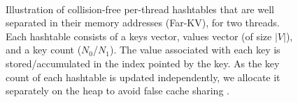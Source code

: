\begin{figure}[hbtp]
  \centering
   \\[-2ex]
  \caption{Illustration of collision-free per-thread hashtables that are well separated in their memory addresses (Far-KV), for two threads. Each hashtable consists of a keys vector, values vector (of size $|V|$), and a key count ($N_0$/$N_1$). The value associated with each key is stored/accumulated in the index pointed by the key. As the key count of each hashtable is updated independently, we allocate it separately on the heap to avoid false cache sharing \cite{sahu2023gvelouvain}.}
  \label{fig:rak-hashtable}
\end{figure}
